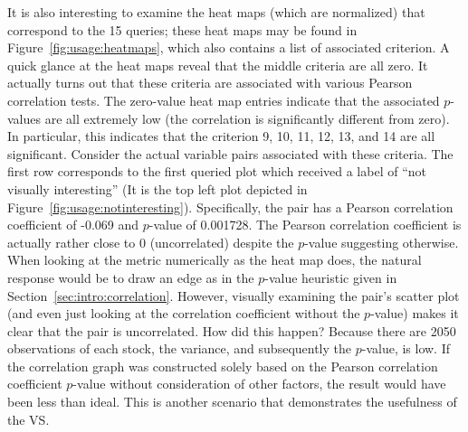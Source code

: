It is also interesting to examine the heat maps (which are normalized) that 
correspond to the 15 queries; these heat maps may be found 
in Figure~\ref{fig:usage:heatmaps}, which also contains a list of associated 
criterion. A quick glance at the heat maps reveal that 
the middle criteria are all zero. It actually turns out that these criteria 
are associated with various Pearson correlation tests. 
The zero-value heat map entries indicate that the associated $p$-values are all 
extremely low (the correlation is significantly different from zero). In 
particular, this indicates that the criterion 9, 10, 11, 12, 13, and 14 are 
all significant. Consider the actual variable pairs associated with these 
criteria. The first row corresponds to the first queried plot which received a 
label of ``not visually interesting'' (It is the top left plot depicted in 
Figure~\ref{fig:usage:notinteresting}). Specifically, the pair has a Pearson 
correlation coefficient of -0.069 and $p$-value of 0.001728. The Pearson 
correlation coefficient is actually rather close to 0 
(uncorrelated) despite the $p$-value suggesting otherwise. When looking at the 
metric numerically as the heat map does, the natural response would be to draw 
an edge as in the $p$-value heuristic given in 
Section~\ref{sec:intro:correlation}. 
However, visually examining the pair's scatter plot (and even just looking at 
the correlation coefficient without the $p$-value) makes it clear that the pair 
is uncorrelated. How did this happen? Because there are 2050 observations of 
each stock, the variance, and subsequently the $p$-value, is low. 
If the correlation graph was constructed solely based on 
the Pearson correlation coefficient $p$-value without consideration of other 
factors, the result would have been less than ideal. This is another scenario 
that demonstrates the usefulness of the VS.

